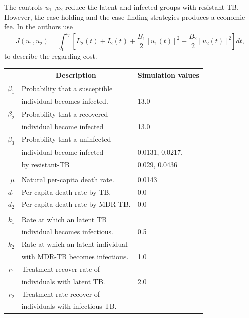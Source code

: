 	The controls $u_1$ ,$u_2$ reduce the latent and infected 
groups with resistant TB. However, the case holding and the case finding 
strategies produces a economic fee. In \cite{Lenhart2002} the authors use
\begin{equation}
	 J(u_1, u_2) =
		 \int_0 ^ {t_f}
			 \left[
				 L_2(t) + I_2(t) 
				 + \frac{B_1}{2} [u_1(t)] ^ 2
				 + \frac{B_2}{2} [u_2(t)] ^ 2
			 \right]dt,
\end{equation}
to describe the regarding cost.
\begin{table}
	\centering
	\begin{tabular}{rll}
		\toprule
			& \multicolumn{1}{c}{\textbf{Description}} & \textbf{Simulation values}
            \\
        \midrule
        $\beta_1$ 
            & Probability that a susceptible 
            \\
            & individual becomes infected.
            & \num{13.0}            
            \\
        $\beta_2$ 
        	& Probability that a recovered 
        	\\
        	& individual  become infected
        	& \num{13.0}
        	\\
        $\beta_3$ 
        	& Probability that a uninfected 
        	\\
        	& individual become infected 
            & \num{0.0131}, 
              \num{0.0217},
            \\
            & by resistant-TB 
            & \num{0.029}, 
              \num{0.0436}
       		\\
     	\\
     	$\mu$ 
     	    & Natural per-capita death rate.
     	    & \num{0.0143}
			\\
     	$d_1$ 
     	    & Per-capita death rate by TB.
     	    & \num{0.0}
     	    \\
     	$d_2$ 
     	   	& Per-capita  death rate by MDR-TB.
     	   	& \num{0.0}
     	    \\
     	\\
     	$k_1$ 
     		& Rate at which an latent TB 
     		\\
     		& individual becomes infectious. 
     		& \num{0.5}
 			\\
     	    $k_2$  
     	    & Rate at which an latent individual
     	    \\
     	    & with MDR-TB becomes infectious.
     	    & \num{1.0}
			\\
		$r_1$ & 
      		Treatment recover rate of 
      		\\
      		& individuals with latent TB.
      		& \num{2.0}
     	    \\
		$r_2$ 
			& Treatment rate recover of 
			\\
			& individuals with infectious TB.
		

\end{tabular}
\end{table}
